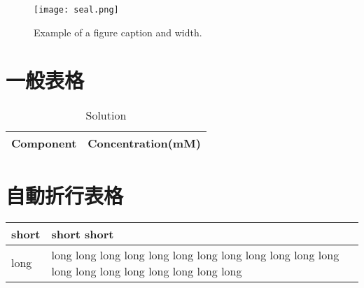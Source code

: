 \begin{figure}[h!]
    \centering
    \texttt{[image: seal.png]} %
    \caption{Example of a figure caption and width.}
    \label{fig}
\end{figure}


\section{一般表格}
\begin{table}[h]
    \centering
    \caption{Solution}
    \begin{tabular}{| l | l |}
        \hline
        Component & Concentration(mM) \\ \hline
    \end{tabular}
\end{table}

\section{自動折行表格}
\begin{table}[h]
    \centering
    \begin{tabularx}{\textwidth}{| l | X |}
        \hline
        short & short short \\ \hline
        long & long long long long long long long long long long  long long long long long long long long long long\\ \hline
    \end{tabularx}
\end{table}
